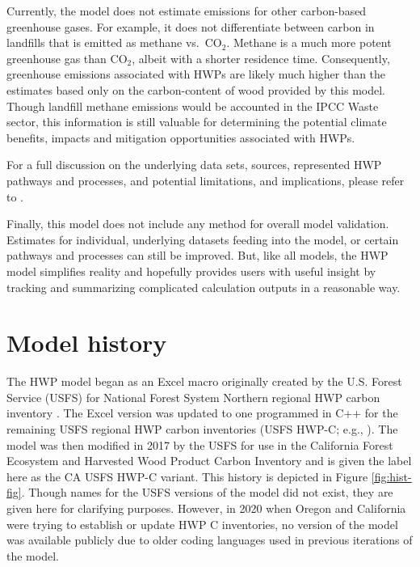 \documentclass[
  openany]{book}
\begin{document}
Currently, the model does not estimate emissions for other carbon-based greenhouse gases. For example, it does not differentiate between carbon in landfills that is emitted as methane vs.~CO\(_2\). Methane is a much more potent greenhouse gas than CO\(_2\), albeit with a shorter residence time. Consequently, greenhouse emissions associated with HWPs are likely much higher than the estimates based only on the carbon-content of wood provided by this model. Though landfill methane emissions would be accounted in the IPCC Waste sector, this information is still valuable for determining the potential climate benefits, impacts and mitigation opportunities associated with HWPs.

For a full discussion on the underlying data sets, sources, represented HWP pathways and processes, and potential limitations, and implications, please refer to \textcite{lucey202X}.

Finally, this model does not include any method for overall model validation. Estimates for individual, underlying datasets feeding into the model, or certain pathways and processes can still be improved. But, like all models, the HWP model simplifies reality and hopefully provides users with useful insight by tracking and summarizing complicated calculation outputs in a reasonable way.

\hypertarget{int-hist}{%
\section{Model history}\label{int-hist}}

The HWP model began as an Excel macro originally created by the U.S. Forest Service (USFS) for National Forest System Northern regional HWP carbon inventory \autocite{anderson2013,stockmann2012}. The Excel version was updated to one programmed in C++ for the remaining USFS regional HWP carbon inventories (USFS HWP-C; e.g., \textcite{stockmann2014}). The model was then modified in 2017 by the USFS for use in the California Forest Ecosystem and Harvested Wood Product Carbon Inventory \autocite{loeffler2019} and is given the label here as the CA USFS HWP-C variant. This history is depicted in Figure \ref{fig:hist-fig}. Though names for the USFS versions of the model did not exist, they are given here for clarifying purposes. However, in 2020 when Oregon and California were trying to establish or update HWP C inventories, no version of the model was available publicly due to older coding languages used in previous iterations of the model.
\end{document}
